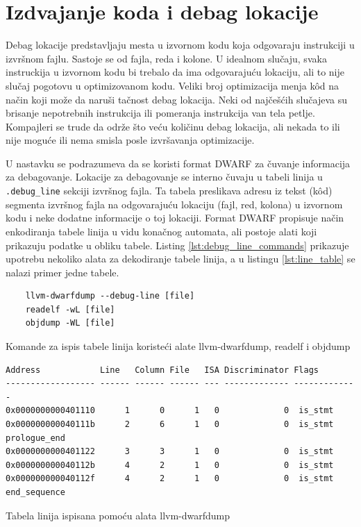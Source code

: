 \documentclass[12pt,oneside]{memoir}
\begin{document}
\section{Izdvajanje koda i debag lokacije}

\label{sec:izdvajanje_koda_debag}

Debag lokacije predstavljaju mesta u izvornom kodu koja odgovaraju instrukciji u izvršnom fajlu. Sastoje se od fajla, reda i kolone.
U idealnom slučaju, svaka instruckija u izvornom kodu bi trebalo da ima odgovarajuću lokaciju, ali to nije slučaj pogotovu u optimizovanom kodu.
Veliki broj optimizacija menja k\^od na način koji može da naruši tačnost debag lokacija.
Neki od najčešćih slučajeva su brisanje nepotrebnih instrukcija ili pomeranja instrukcija van tela petlje.
Kompajleri se trude da održe što veću količinu debag lokacija, ali nekada to ili nije moguće ili nema smisla posle izvršavanja optimizacije.

U nastavku se podrazumeva da se koristi format DWARF za čuvanje informacija za debagovanje.
Lokacije za debagovanje se interno čuvaju u tabeli linija u \verb|.debug_line| sekciji izvršnog fajla.
Ta tabela preslikava adresu iz tekst (k\^od) segmenta izvršnog fajla na odgovarajuću lokaciju (fajl, red, kolona) u izvornom kodu i neke dodatne informacije o toj lokaciji.
Format DWARF propisuje način enkodiranja tabele linija u vidu konačnog automata, ali postoje alati koji prikazuju podatke u obliku tabele.
Listing \ref{lst:debug_line_commands} prikazuje upotrebu nekoliko alata za dekodiranje tabele linija, a u listingu \ref{lst:line_table} se nalazi primer jedne tabele.

\begin{listing}
  \begin{verbatim}
    llvm-dwarfdump --debug-line [file]
    readelf -wL [file]
    objdump -WL [file]
  \end{verbatim}
  \caption{Komande za ispis tabele linija koristeći alate llvm-dwarfdump, readelf i objdump}
  \label{lst:debug_line_commands}
\end{listing}

\begin{listing}
  \begin{verbatim}
Address            Line   Column File   ISA Discriminator Flags
------------------ ------ ------ ------ --- ------------- -------------
0x0000000000401110      1      0      1   0             0  is_stmt
0x000000000040111b      2      6      1   0             0  is_stmt prologue_end
0x0000000000401122      3      3      1   0             0  is_stmt
0x000000000040112b      4      2      1   0             0  is_stmt
0x000000000040112f      4      2      1   0             0  is_stmt end_sequence
  \end{verbatim}
  \caption{Tabela linija ispisana pomoću alata llvm-dwarfdump}
  \label{lst:line_table}
\end{listing}
\end{document}
